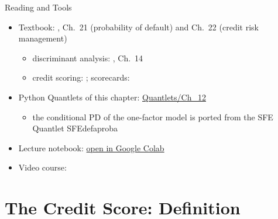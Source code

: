 \begin{frame}{Reading and Tools}
\itemsize{\small}
\begin{itemize}
    \item Textbook: , Ch.~21 (probability of default) and Ch.~22 (credit risk management)
    \begin{itemize}
        \item discriminant analysis: , Ch.~14
        \item credit scoring: ; scorecards: 
    \end{itemize}
    \item Python Quantlets of this chapter: \href{https://github.com/danpele/SFM/tree/main/Quantlets/Ch_12}{Quantlets/Ch\_12}
    \begin{itemize}
        \item the conditional PD of the one-factor model is ported from the SFE Quantlet SFEdefaproba
    \end{itemize}
    \item Lecture notebook: \href{\colaburl{notebooks/EN/chapter12_lecture_notebook.ipynb}}{open in Google Colab}
    \item Video course: 
\end{itemize}
\end{frame}


\section{The Credit Score: Definition}

